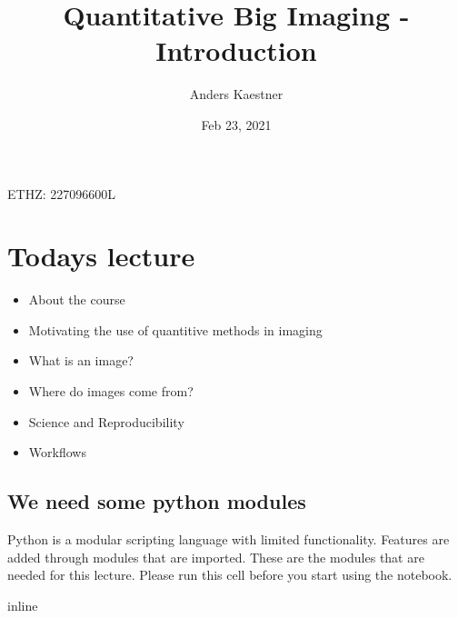 \documentclass[letterpaper,10pt,english]{sphinxmanual}
\title{Quantitative Big Imaging - Introduction}
\date{Feb 23, 2021}
\author{Anders Kaestner}
\begin{document}
\pagestyle{empty}
\sphinxmaketitle
\pagestyle{plain}
\sphinxtableofcontents
\pagestyle{normal}
\label{\detokenize{01-Introduction::doc}}


\sphinxAtStartPar
{} ETHZ: 227\sphinxhyphen{}0966\sphinxhyphen{}00L




\chapter{Todays lecture}
\label{\detokenize{01-Introduction:todays-lecture}}\begin{itemize}
\item {} 
\sphinxAtStartPar
About the course

\item {} 
\sphinxAtStartPar
Motivating the use of quantitive methods in imaging

\item {} 
\sphinxAtStartPar
What is an image?

\item {} 
\sphinxAtStartPar
Where do images come from?

\item {} 
\sphinxAtStartPar
Science and Reproducibility

\item {} 
\sphinxAtStartPar
Workflows

\end{itemize}


\section{We need some python modules}
\label{\detokenize{01-Introduction:we-need-some-python-modules}}
\sphinxAtStartPar
Python is a modular scripting language with limited functionality. Features are added through modules that are imported.
These are the modules that are needed for this lecture. Please run this cell before you start using the notebook.

\begin{sphinxVerbatim}[commandchars=\\\{\}]
   
   
   
 inline

   
   
   
   
   
 
   
\end{sphinxVerbatim}
\end{document}
